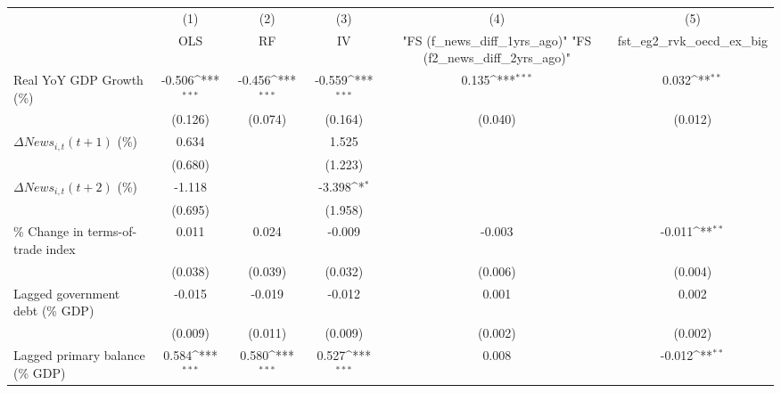 {
\def\sym#1{\ifmmode^{#1}\else\(^{#1}\)\fi}
\begin{tabular}{l*{5}{c}}
\toprule
                    &\multicolumn{1}{c}{(1)}&\multicolumn{1}{c}{(2)}&\multicolumn{1}{c}{(3)}&\multicolumn{1}{c}{(4)}&\multicolumn{1}{c}{(5)}\\
                    &\multicolumn{1}{c}{OLS}&\multicolumn{1}{c}{RF}&\multicolumn{1}{c}{IV}&\multicolumn{1}{c}{ "FS (f_news_diff_1yrs_ago)"  "FS (f2_news_diff_2yrs_ago)" }&\multicolumn{1}{c}{fst_eg2_rvk_oecd_ex_big}\\
\midrule
Real YoY GDP Growth (\%)&      -0.506\sym{***}&      -0.456\sym{***}&      -0.559\sym{***}&       0.135\sym{***}&       0.032\sym{**} \\
                    &     (0.126)         &     (0.074)         &     (0.164)         &     (0.040)         &     (0.012)         \\
\addlinespace
$ \Delta News_{i,t}(t+1)$ (\%)&       0.634         &                     &       1.525         &                     &                     \\
                    &     (0.680)         &                     &     (1.223)         &                     &                     \\
\addlinespace
$ \Delta News_{i,t}(t+2)$ (\%)&      -1.118         &                     &      -3.398\sym{*}  &                     &                     \\
                    &     (0.695)         &                     &     (1.958)         &                     &                     \\
\addlinespace
\% Change in terms-of-trade index&       0.011         &       0.024         &      -0.009         &      -0.003         &      -0.011\sym{**} \\
                    &     (0.038)         &     (0.039)         &     (0.032)         &     (0.006)         &     (0.004)         \\
\addlinespace
Lagged government debt (\% GDP)&      -0.015         &      -0.019         &      -0.012         &       0.001         &       0.002         \\
                    &     (0.009)         &     (0.011)         &     (0.009)         &     (0.002)         &     (0.002)         \\
\addlinespace
Lagged primary balance (\% GDP)&       0.584\sym{***}&       0.580\sym{***}&       0.527\sym{***}&       0.008         &      -0.012\sym{**} \\

\end{tabular}}

